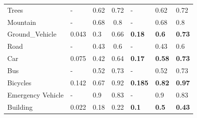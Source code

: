\begin{table}[h]
\begin{tabular}{lp{1.2cm}p{1.2cm}p{1.2cm}p{1.2cm}p{1.2cm}p{1.2cm}}
\multicolumn{1}{l|}{Trees}                                               & -                         & 0.62                     & \multicolumn{1}{c|}{0.72}                & -                                  & 0.62                              & 0.72                              \\
\multicolumn{1}{l|}{Mountain}                                            & -                         & 0.68                     & \multicolumn{1}{c|}{0.8}                 & -                                  & 0.68                              & 0.8                               \\
\multicolumn{1}{l|}{Ground\_Vehicle}                                     & 0.043                     & 0.3                      & \multicolumn{1}{c|}{0.66}                & \textbf{0.18}                      & \textbf{0.6}                      & \textbf{0.73}                     \\
\multicolumn{1}{l|}{Road}                                                & -                         & 0.43                     & \multicolumn{1}{c|}{0.6}                 & -                                  & 0.43                              & 0.6                               \\
\multicolumn{1}{l|}{Car}                                                 & 0.075                     & 0.42                     & \multicolumn{1}{c|}{0.64}                & \textbf{0.17}                      & \textbf{0.58}                     & \textbf{0.73}                     \\
\multicolumn{1}{l|}{Bus}                                                 & -                         & 0.52                     & \multicolumn{1}{c|}{0.73}                & -                                  & 0.52                              & 0.73                              \\
\multicolumn{1}{l|}{Bicycles}                                            & 0.142                     & 0.67                     & \multicolumn{1}{c|}{0.92}                & \textbf{0.185}                     & \textbf{0.82}                     & \textbf{0.97}                     \\
\multicolumn{1}{l|}{Emergency Vehicle}                                   & -                         & 0.9                      & \multicolumn{1}{c|}{0.83}                & -                                  & 0.9                               & 0.83                              \\
\multicolumn{1}{l|}{Building}                                            & 0.022                     & 0.18                     & \multicolumn{1}{c|}{0.22}                & \textbf{0.1}                       & \textbf{0.5}                      & \textbf{0.43}                     \\

\end{tabular}
\end{table}
